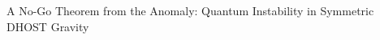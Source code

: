 \documentclass[twocolumn]{aastex631}
\begin{document}
A No-Go Theorem from the Anomaly: Quantum Instability in Symmetric DHOST Gravity
\end{document}
